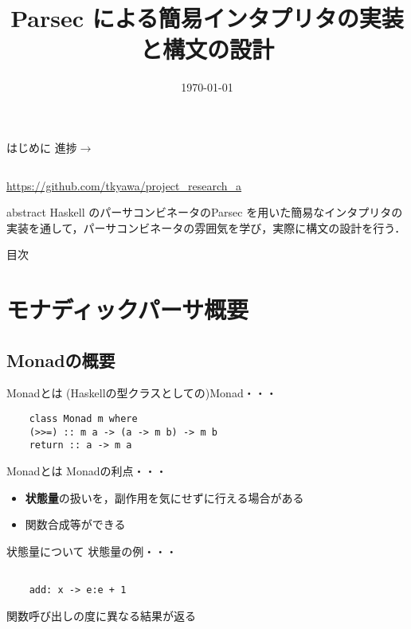 \documentclass[uplatex,dvipdfmx,ja=standard]{beamer}
\begin{document}
%
%
\title[Midterm Presentation]{Parsec による簡易インタプリタの実装と構文の設計} 
\date{\today}

\begin{frame}
\titlepage 
\end{frame}

\begin{frame}[fragile]{はじめに}
    \large 進捗$\to$
    \begin{verbatim}
    \end{verbatim}
    \url{https://github.com/tkyawa/project_research_a}
\end{frame}

\begin{frame}{abstract}
    Haskell のパーサコンビネータのParsec を用いた簡易なインタプリタの実装を通して，パーサコンビネータの雰囲気を学び，実際に構文の設計を行う．
\end{frame}

\begin{frame}{目次}
    \tableofcontents
\end{frame}

\section{モナディックパーサ概要}
\subsection{Monadの概要}
\begin{frame}[fragile]{Monadとは}
    (Haskellの型クラスとしての)Monad・・・
    \begin{verbatim}
    class Monad m where 
    (>>=) :: m a -> (a -> m b) -> m b 
    return :: a -> m a
    \end{verbatim}
\end{frame}

\begin{frame}{Monadとは}
    Monadの利点・・・
    \begin{itemize}
        \item \textbf{状態量}の扱いを，副作用を気にせずに行える場合がある
        \item 関数合成等ができる
    \end{itemize}
\end{frame}

\begin{frame}[fragile]{状態量について}
    状態量の例・・・
    \begin{verbatim}
    
    add: x -> e:e + 1

    \end{verbatim}

    関数呼び出しの度に異なる結果が返る
\end{frame}
\end{document}
